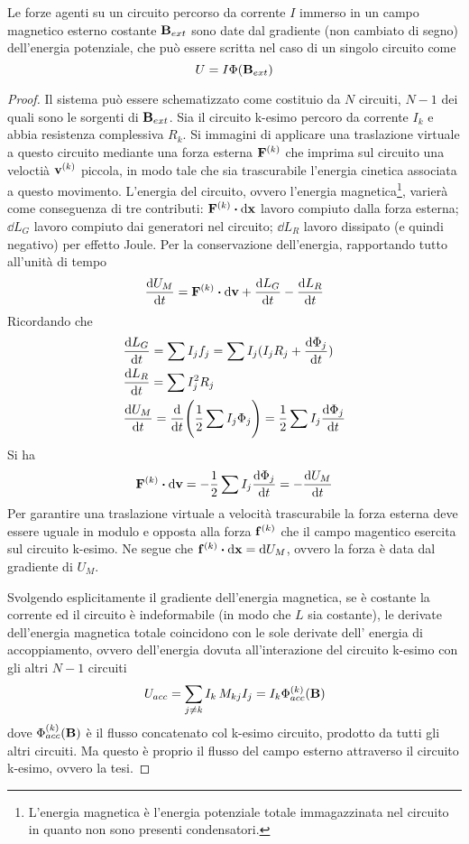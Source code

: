 \begin{thm}
    Le forze agenti su un circuito percorso da corrente $I$ immerso in un campo magnetico esterno costante
    $\vb{B}_{ext}$ sono date dal gradiente (non cambiato di segno) dell'energia potenziale, che può essere scritta
    nel caso di un singolo circuito come
    \[
        U=I\Phi(\vb{B}_{ext})
    \]
\end{thm}
\begin{proof}
    Il sistema può essere schematizzato come costituio da
    $N$ circuiti, $N-1$ dei quali sono le sorgenti di $\vb{B}_{ext}$. Sia il circuito k-esimo percoro da corrente $I_k$ e abbia
    resistenza complessiva $R_k$. Si immagini di applicare una traslazione virtuale a questo circuito
    mediante una forza esterna $\vb{F}^{(k)}$ che imprima sul circuito una veloctià $\vb{v}^{(k)}$
    piccola, in modo tale che sia trascurabile l'energia cinetica associata a questo movimento.
    L'energia del circuito, ovvero l'energia magnetica\footnote{L'energia magnetica è l'energia potenziale totale
    immagazzinata nel circuito in quanto non sono presenti condensatori.}, varierà come conseguenza di tre contributi:
    $\vb{F}^{(k)}\vdot\dd{\vb{x}}$ lavoro compiuto
    dalla forza esterna; $\dd{L}_G$ lavoro compiuto dai generatori nel circuito; $\dd{L}_{R}$ lavoro
    dissipato (e quindi negativo) per effetto Joule. Per la conservazione dell'energia, rapportando tutto all'unità di tempo
    \[
        \dv{U_M}{t}=\vb{F}^{(k)}\vdot\dd{\vb{v}} + \dv{L_G}{t} - \dv{L_R}{t}
    \]
    Ricordando che
    \[
        \begin{split}
            &\dv{L_G}{t}=\sum I_j f_j=\sum I_j(I_j R_j + \dv{\Phi_j}{t} ) \\
            &\dv{L_R}{t}=\sum I^2_j R_j \\
            &\dv{U_M}{t}=\dv{t} \Biggl(\frac{1}{2} \sum I_j \Phi_j \Biggr)=
            \frac{1}{2} \sum I_j \dv{\Phi_j}{t}
        \end{split}
    \]
    Si ha
    \[
        \vb{F}^{(k)}\vdot\dd{\vb{v}}=-\rec{2}\sum I_j\dv{\Phi_j}{t}=-\dv{U_M}{t}
    \]
    Per garantire una traslazione virtuale a velocità trascurabile la forza esterna deve essere
    uguale in modulo e opposta alla forza $\vb{f}^{(k)}$ che il campo magentico esercita sul
    circuito k-esimo. Ne segue che $\vb{f}^{(k)}\vdot\dd{\vb{x}}=\dd{U_M}$, ovvero la forza è data
    dal gradiente di $U_M$.

    Svolgendo esplicitamente il gradiente dell'energia magnetica, se è costante la corrente ed il circuito è
    indeformabile (in modo che $L$ sia costante), le derivate dell'energia magnetica totale coincidono con le sole derivate dell'
    energia di accoppiamento, ovvero dell'energia dovuta all'interazione del circuito k-esimo con gli altri $N-1$ circuiti
    \[
        U_{acc}=\sum_{j\neq k} I_k \,M_{kj}I_j=I_k\Phi^{(k)}_{acc}(\vb{B})
    \]
    dove $\Phi^{(k)}_{acc}(\vb{B})$ è il flusso concatenato col k-esimo circuito, prodotto
    da tutti gli altri circuiti. Ma questo è proprio il flusso del campo esterno attraverso il
    circuito k-esimo, ovvero la tesi.
\end{proof}

